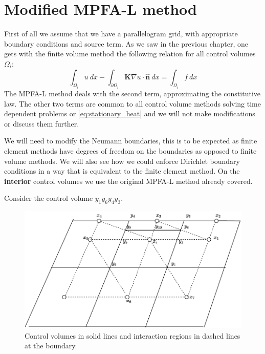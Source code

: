 \documentclass[../Main/main.tex]{subfiles}
\begin{document}
	\section*{Modified MPFA-L method}
	First of all we assume that we have a parallelogram grid, 
	with appropriate boundary conditions and source term.
	As we saw in the previous chapter, one gets with the finite volume method the following relation for all control volumes $\Omega_i$:
	\begin{equation}
		\int_{\Omega_i} u \ dx - \int_{\partial \Omega_i} \pmb{K}\nabla u \cdot \hat{\pmb{n}}\ dx = \int_{\Omega_i} f \ dx
	\end{equation}
	The MPFA-L method deals with the second term, approximating the constitutive law. The other two terms are common to all control volume methods solving time dependent problems or \eqref{eq:stationary_heat} and we will not make modifications or discuss them further.
	\par
	We will need to modify the Neumann boundaries, this is to be expected as finite element methods have degrees of freedom on the boundaries as opposed to finite volume methods. We will also see how we could enforce Dirichlet boundary conditions in a way that is equivalent to the finite element method. On the \textbf{interior} control volumes we use the original MPFA-L method already covered.
	\par
	Consider the control volume $y_1 y_6 y_4 y_3$. 
	\begin{figure}[H]
		\centering
		\includegraphics{modified_L_scheme.pdf}
		\caption{Control volumes in solid lines and interaction regions in dashed lines at the boundary.}
		\label{fig:volemes along boundary}
	\end{figure}
\end{document}
